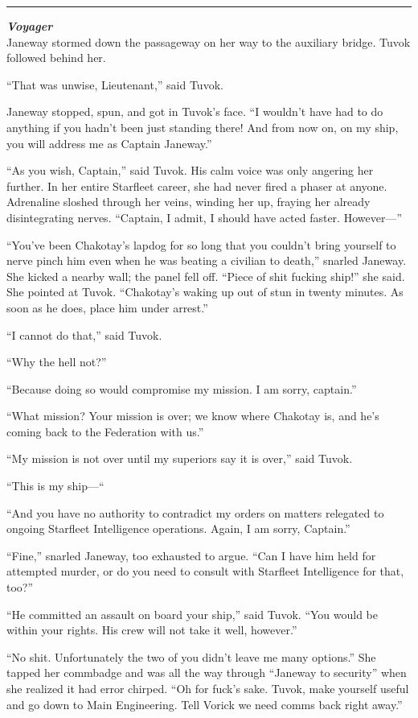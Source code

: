\documentclass[twoside,letterpaper,12pt]{memoir}
\begin{document}
\fancybreak{\rule{3cm}{0.4 pt}}
\noindent\textit{\textbf{Voyager}}\\

Janeway stormed down the passageway on her way to the auxiliary bridge. Tuvok followed behind her.

``That was unwise, Lieutenant,'' said Tuvok.

Janeway stopped, spun, and got in Tuvok's face. ``I wouldn't have had to do anything if you hadn't been just standing there! And from now on, on my ship, you will address me as Captain Janeway.''

``As you wish, Captain,'' said Tuvok. His calm voice was only angering her further. In her entire Starfleet career, she had never fired a phaser at anyone. Adrenaline sloshed through her veins, winding her up, fraying her already disintegrating nerves. ``Captain, I admit, I should have acted faster. However---''

``You've been Chakotay's lapdog for so long that you couldn't bring yourself to nerve pinch him even when he was beating a civilian to death,'' snarled Janeway. She kicked a nearby wall; the panel fell off. ``Piece of shit fucking ship!'' she said. She pointed at Tuvok. ``Chakotay's waking up out of stun in twenty minutes. As soon as he does, place him under arrest.''

``I cannot do that,'' said Tuvok.

``Why the hell not?''

``Because doing so would compromise my mission. I am sorry, captain.''

``What mission? Your mission is over; we know where Chakotay is, and he’s coming back to the Federation with us.''

``My mission is not over until my superiors say it is over,'' said Tuvok.

``This is my ship—``

``And you have no authority to contradict my orders on matters relegated to ongoing Starfleet Intelligence operations. Again, I am sorry, Captain.''

``Fine,'' snarled Janeway, too exhausted to argue. ``Can I have him held for attempted murder, or do you need to consult with Starfleet Intelligence for that, too?''

``He committed an assault on board your ship,'' said Tuvok. ``You would be within your rights. His crew will not take it well, however.''

``No shit. Unfortunately the two of you didn’t leave me many options.'' She tapped her commbadge and was all the way through ``Janeway to security'' when she realized it had error chirped. ``Oh for fuck's sake. Tuvok, make yourself useful and go down to Main Engineering. Tell Vorick we need comms back right away.''
\end{document}

